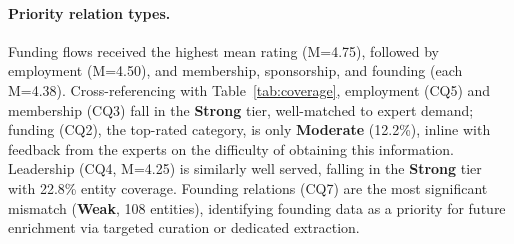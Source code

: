 \vspace{-0.2cm}\paragraph{Priority relation types.} Funding flows received the highest mean rating (M=4.75), followed by employment (M=4.50), and membership, sponsorship, and founding (each M=4.38).
Cross-referencing with Table~\ref{tab:coverage}, employment (CQ5) and membership (CQ3) fall in the \textbf{Strong} tier, well-matched to expert demand; funding (CQ2), the top-rated category, is only \textbf{Moderate} (12.2\%), inline with feedback from the experts on the difficulty of obtaining this information. %
Leadership (CQ4, M=4.25) is similarly well served, falling in the \textbf{Strong} tier with 22.8\% entity coverage.
Founding relations (CQ7) are the most significant mismatch (\textbf{Weak}, 108 entities), identifying founding data as a priority for future enrichment via targeted curation or dedicated extraction.


